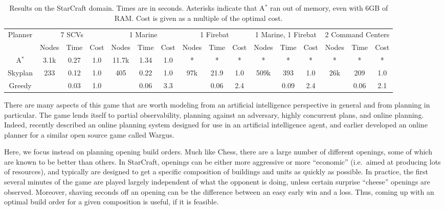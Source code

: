 \documentclass[letterpaper]{article}
\theoremstyle{plain} \newtheorem{theorem}{Theorem} \newtheorem{proposition}{Proposition} \newtheorem{lemma}{Lemma}
\theoremstyle{definition} \newtheorem{definition}{Definition} \newtheorem{conjecture}{Conjecture} \newtheorem*{example}{Example}
\theoremstyle{remark} \newtheorem*{remark}{Remark} \newtheorem*{note}{Note} \newtheorem{case}{Case}
\newcommand{\Astar}{A$^*$ }
\begin{document}
\begin{table}
  \footnotesize
	\begin{center}
		\begin{tabular}{|c|ccc|ccc|ccc|ccc|ccc|}
		\hline
		\multirow{2}{*}{Planner} & \multicolumn{3}{c|}{7 SCVs}  & \multicolumn{3}{c|}{1 Marine} & \multicolumn{3}{c|}{1 Firebat} & \multicolumn{3}{c|}{1 Marine, 1 Firebat} & \multicolumn{3}{c|}{2 Command Centers} \\
		& Nodes & Time & Cost & Nodes & Time &Cost & Nodes & Time & Cost & Nodes & Time & Cost & Nodes & Time & Cost\\
		\hline
		\Astar 		& 3.1k & 0.27 & 1.0 & 11.7k & 1.34 & 1.0 &*  & * & *& *& *& *& *& *&* \\  
		Skyplan           & 233 & 0.12 & 1.0 & 405 & 0.22 & 1.0 & 97k & 21.9 & 1.0 & 509k & 393 & 1.0 & 26k & 209 & 1.0 \\
		Greedy		&  & 0.03 & 1.0 &  & 0.06 & 3.3 &  & 0.06 & 2.4 &  & 0.09 & 2.4 &  & 0.06 & 2.1 \\
		\hline
		\end{tabular}
	\end{center}
	\caption{Results on the StarCraft domain. Times are in seconds.  Asterisks indicate that \Astar ran out of memory, even with 6GB
  of RAM. Cost is given as a multiple of the optimal cost.}
	\label{tab:starcraft}
\end{table}


There are many aspects of this game that are worth modeling from
an artificial intelligence perspective in general and from planning
in particular. The game lends itself to partial observability,
planning against an adversary, highly concurrent plans, and online
planning.  Indeed, \citet{churchill11build} recently described an
online planning system designed for use in an artificial intelligence
agent, and \citet{chan07online} earlier developed an online planner
for a similar open source game called Wargus.

Here, we focus instead on planning opening build orders. Much like
Chess, there are a large number of different openings, some of which
are known to be better than others. In StarCraft, openings can be
either more aggressive or more ``economic'' (i.e.\ aimed at producing
lots of resources), and typically are designed to get a specific composition
of buildings and units as quickly as possible.  In practice, the
first several minutes of the game are played largely independent
of what the opponent is doing, unless certain surprise ``cheese''
openings are observed. Moreover, shaving seconds off an opening can
be the difference between an easy early win and a loss. Thus, coming
up with an optimal build order for a given composition is useful,
if it is feasible.
\end{document}
